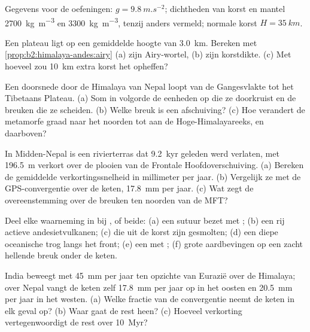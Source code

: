 Gegevens voor de oefeningen: $g = \qty{9.8}{m.s^{-2}}$; dichtheden van korst en mantel
\qty{2700}{kg.m^{-3}} en \qty{3300}{kg.m^{-3}}, tenzij anders vermeld; normale korst $H =
\qty{35}{km}$.

\begin{exercise}[$\star$]\label{exo:b2:himalaya-andes:1}
Een plateau ligt op een gemiddelde hoogte van \qty{3.0}{km}. Bereken met
\cref{prop:b2:himalaya-andes:airy} (a) zijn Airy-wortel, (b) zijn korstdikte.
(c) Met hoeveel zou \qty{10}{km} extra korst het opheffen?
\end{exercise}

\begin{exercise}[$\star$]\label{exo:b2:himalaya-andes:2}
Een doorsnede door de Himalaya van Nepal loopt van de Gangesvlakte tot het Tibetaans Plateau.
(a) Som in volgorde de eenheden op die ze doorkruist en de breuken die ze scheiden. (b) Welke breuk
is een afschuiving? (c) Hoe verandert de metamorfe graad naar het noorden tot aan de
Hoge-Himalayareeks, en daarboven?
\end{exercise}

\begin{exercise}[$\star$]\label{exo:b2:himalaya-andes:3}
In Midden-Nepal is een rivierterras dat \qty{9.2}{kyr} geleden werd verlaten, met
\qty{196.5}{m} verkort over de plooien van de Frontale Hoofdoverschuiving. (a) Bereken de gemiddelde
verkortingssnelheid in millimeter per jaar. (b) Vergelijk ze met de GPS-convergentie over de keten,
\qty{17.8}{mm} per jaar. (c) Wat zegt de overeenstemming over de breuken ten noorden van de MFT?
\end{exercise}

\begin{exercise}[$\star$]\label{exo:b2:himalaya-andes:4}
Deel elke waarneming in bij ,  of beide: (a) een sutuur bezet
met ; (b) een rij actieve andesietvulkanen; (c)  die uit de
korst zijn gesmolten; (d) een diepe oceanische trog langs het front; (e) een  met ;
(f) grote aardbevingen op een zacht hellende breuk onder de keten.
\end{exercise}

\begin{exercise}[$\star\star$]\label{exo:b2:himalaya-andes:5}
India beweegt met \qty{45}{mm} per jaar ten opzichte van Eurazië over de Himalaya; over Nepal
vangt de keten zelf \qty{17.8}{mm} per jaar op in het oosten en \qty{20.5}{mm} per jaar in het westen.
(a) Welke fractie van de convergentie neemt de keten in elk geval op? (b) Waar gaat de
rest heen? (c) Hoeveel verkorting vertegenwoordigt de rest over \qty{10}{Myr}?
\end{exercise}


